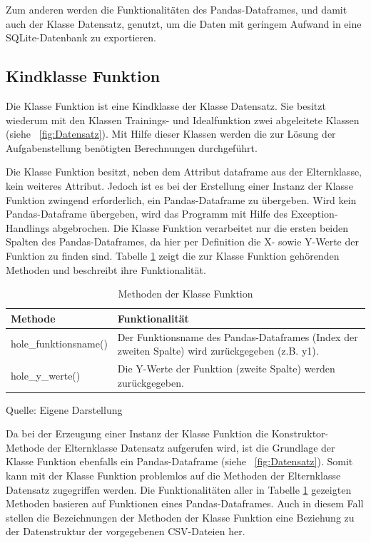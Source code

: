 \documentclass[
    a4paper, 								%
    oneside, 								%
    11pt, 									%
    listof=totoc, 					%
    bibliography=totoc, 		%
    final, 									%
    numbers=noenddot
]{scrreprt}
\newcommand{\abbildung}[1]{\figurename\ \ref{#1}}
\begin{document}
Zum anderen werden die Funktionalitäten des Pandas-Dataframes, und damit auch der Klasse Datensatz, genutzt, um die Daten mit geringem Aufwand in eine SQLite-Datenbank zu exportieren. 

\subsection{Kindklasse Funktion}
\label{sub:Funktion}
Die Klasse Funktion ist eine Kindklasse der Klasse Datensatz. Sie besitzt wiederum mit den Klassen Trainings- und Idealfunktion zwei abgeleitete Klassen (siehe \abbildung{fig:Datensatz}). Mit Hilfe dieser Klassen werden die zur Lösung der Aufgabenstellung benötigten Berechnungen durchgeführt. 

Die Klasse Funktion besitzt, neben dem Attribut dataframe aus der Elternklasse, kein weiteres Attribut. Jedoch ist es bei der Erstellung einer Instanz der Klasse Funktion zwingend erforderlich, ein Pandas-Dataframe zu übergeben. Wird kein Pandas-Dataframe übergeben, wird das Programm mit Hilfe des Exception-Handlings abgebrochen. Die Klasse Funktion verarbeitet nur die ersten beiden Spalten des Pandas-Dataframes, da hier per Definition die X- sowie Y-Werte der Funktion zu finden sind. Tabelle \ref{tab:Klasse_Funktion} zeigt die zur Klasse Funktion gehörenden Methoden und beschreibt ihre Funktionalität. 

\begin{table}[!h]
\centering
\caption{Methoden der Klasse Funktion}
\vspace{6pt}
\begin{tabularx}{0.95\textwidth}{|l|X|}
\hline
\textbf{Methode} & \textbf{Funktionalität}\\
\hline
hole\_funktionsname() & Der Funktionsname des Pandas-Dataframes (Index der zweiten Spalte) wird zurückgegeben (z.B. y1).\\
\hline
hole\_y\_werte() & Die Y-Werte der Funktion (zweite Spalte) werden zurückgegeben.\\
\hline
\end{tabularx}
\vspace{6pt}

Quelle: Eigene Darstellung
\label{tab:Klasse_Funktion}
\end{table}

Da bei der Erzeugung einer Instanz der Klasse Funktion die Konstruktor-Methode der Elternklasse Datensatz aufgerufen wird, ist die Grundlage der Klasse Funktion ebenfalls ein Pandas-Dataframe (siehe \abbildung{fig:Datensatz}). Somit kann mit der Klasse Funktion  problemlos auf die Methoden der Elternklasse Datensatz zugegriffen werden. Die Funktionalitäten aller in Tabelle \ref{tab:Klasse_Funktion} gezeigten Methoden basieren auf Funktionen eines Pandas-Dataframes. Auch in diesem Fall stellen die Bezeichnungen der Methoden der Klasse Funktion eine Beziehung zu der Datenstruktur der vorgegebenen CSV-Dateien her. 
\end{document}
